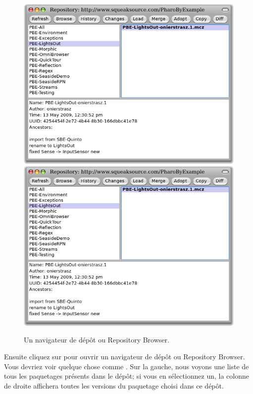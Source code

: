 \documentclass[a4paper,10pt,twoside]{book}
\begin{document}
\begin{figure}[btp]
	\begin{center}
	\ifluluelse
		{\includegraphics[width=\textwidth]{SqueakSource-PBE}}
		{\includegraphics[scale=0.7]{SqueakSource-PBE}}
	\end{center}
	\caption{Un navigateur de d\'ep\^ot ou Repository Browser.}
	\label{fig:SqueakSource:PBE}
\end{figure}
\noindent

Ensuite cliquez sur  pour ouvrir un navigateur de d\'ep\^ot ou
Repository Browser. Vous devriez voir quelque chose comme
 .  
Sur la gauche, nous voyons une liste de tous les paquetages pr\'esents dans le
d\'ep\^ot; si vous en s\'electionnez un, la colonne de droite affichera
toutes les versions du paquetage choisi dans ce d\'ep\^ot.
\end{document}
